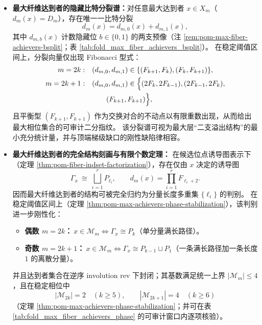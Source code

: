 \begin{enumerate}
\begin{itemize}
    \item \textbf{最大纤维达到者的隐藏比特分裂谱：}对任意最大达到者 \(x\in X_m\)（\(d_m(x)=D_m\)），存在唯一一比特分裂
    \[
    d_m(x)=d_{m,0}(x)+d_{m,1}(x),
    \]
    其中 \(d_{m,b}(x)\) 计数隐藏位 \(b\in\{0,1\}\) 的两支预像（注 \ref{rem:pom-max-fiber-achievers-bsplit}；表 \ref{tab:fold_max_fiber_achievers_bsplit}）。
    在稳定阈值区间上，分裂向量仅出现 Fibonacci 型式：
    \[
    \begin{aligned}
    m=2k:\quad &(d_{m,0},d_{m,1})\in\{(F_{k+1},F_k),(F_k,F_{k+1})\},\\
    m=2k+1:\quad &(d_{m,0},d_{m,1})\in
    \Bigl\{(2F_k,2F_{k-1}), (2F_{k-1},2F_k),\\
    &\qquad (F_{k+1},F_{k+1})\Bigr\},
    \end{aligned}
    \]
    且平衡型 \((F_{k+1},F_{k+1})\) 作为交换对合的不动点以有限重数出现，从而给出最大相位集合的可审计二分指纹。
    该分裂谱可视为最大层“二支溢出结构”的最小充分统计量，并与顶端梯级缺口的刚性缺陷律相容。

    \item \textbf{最大纤维达到者的完全结构刻画与有限个数定理：}
    在候选位点诱导图表示下（定理 \ref{thm:pom-fiber-indset-factorization}），存在仅由 \(x\) 决定的诱导图
    \[
    \Gamma_x\ \cong\ \bigsqcup_{i=1}^r P_{\ell_i},
    \qquad
    d_m(x)=\prod_{i=1}^r F_{\ell_i+2}.
    \]
    因而最大纤维达到者的结构可被完全归约为分量长度多重集 \(\{\ell_i\}\) 的判别。
    在稳定阈值区间上（定理 \ref{thm:pom-max-achievers-phase-stabilization}），该判别进一步刚性化：
    \begin{itemize}
      \item \textbf{偶数 \(m=2k\)：}\(\ x\in\mathcal{M}_m\iff \Gamma_x\cong P_k\)（单分量满长路径）。
      \item \textbf{奇数 \(m=2k+1\)：}\(\ x\in\mathcal{M}_m\iff \Gamma_x\cong P_{k-1}\sqcup P_1\)（一条满长路径加一条长度 \(1\) 的离散分量）。
    \end{itemize}
    并且达到者集合在逆序 involution \(\mathrm{rev}\) 下封闭；其基数满足统一上界 \(|\mathcal{M}_m|\le 4\)，且在稳定相位中
    \[
    |\mathcal{M}_{2k}|=2\quad(k\ge 5),
    \qquad
    |\mathcal{M}_{2k+1}|=4\quad(k\ge 6)
    \]
    （定理 \ref{thm:pom-max-achievers-phase-stabilization}；并可在表 \ref{tab:fold_max_fiber_achievers_phase} 的可审计窗口内逐项核验）。


\end{itemize}
\end{enumerate}
